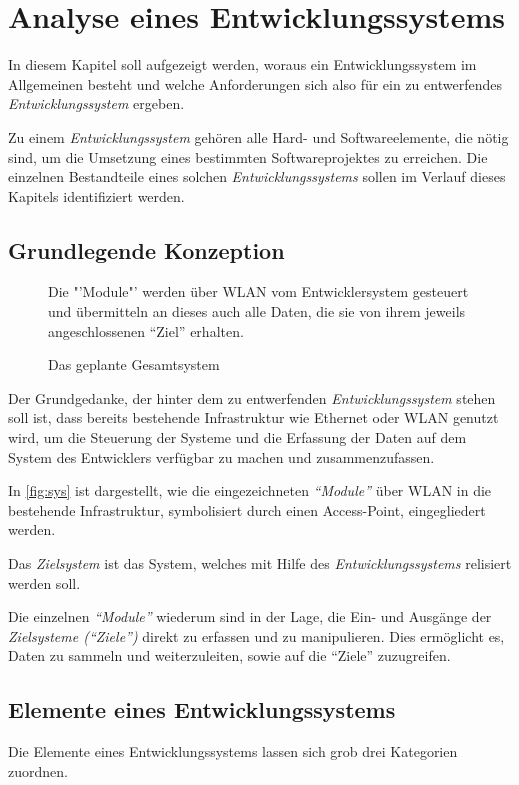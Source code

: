 \chapter{Analyse eines Entwicklungssystems}\label{chap:analyse}
\minitoc
In diesem Kapitel soll aufgezeigt werden, woraus ein Entwicklungssystem
im Allgemeinen besteht und welche Anforderungen sich also für ein zu
entwerfendes \emph{Entwicklungssystem} ergeben.
\begin{definition}[Entwicklungssystem]
Zu einem \emph{Entwicklungssystem} gehören
alle Hard- und Softwareelemente, die nötig sind, um die Umsetzung eines
bestimmten Softwareprojektes zu erreichen. Die einzelnen Bestandteile eines
solchen \emph{Entwicklungssystems} sollen im Verlauf dieses Kapitels
identifiziert werden.
\end{definition}
\section{Grundlegende Konzeption}
\begin{figure}[H]
\centering
\def\svgwidth{\columnwidth}

\caption{Das geplante Gesamtsystem}{Die "'Module"' werden über WLAN
vom Entwicklersystem gesteuert und übermitteln an dieses auch alle
Daten, die sie von ihrem jeweils angeschlossenen "`Ziel"' erhalten.}
\label{fig:sys}
\end{figure}
Der Grundgedanke, der hinter dem zu entwerfenden \emph{Entwicklungssystem}
stehen soll ist, dass bereits bestehende Infrastruktur wie Ethernet oder WLAN
genutzt wird, um die Steuerung der Systeme und die Erfassung der Daten
auf dem System des Entwicklers verfügbar zu machen und zusammenzufassen.

In \autoref{fig:sys} ist dargestellt, wie die eingezeichneten \emph{"`Module"'}
über WLAN in die bestehende Infrastruktur, symbolisiert durch einen
Access-Point, eingegliedert werden.
\begin{definition}[Zielsystem]
Das \emph{Zielsystem} ist das System, welches mit Hilfe des
\emph{Entwicklungssystems} relisiert werden soll.
\end{definition}
Die einzelnen \emph{"`Module"'} wiederum sind in der Lage, die Ein- und Ausgänge
der \emph{Zielsysteme ("`Ziele"')} direkt zu erfassen und zu manipulieren. Dies
ermöglicht es, Daten zu sammeln und weiterzuleiten, sowie auf die "`Ziele"'
zuzugreifen.

\section{Elemente eines Entwicklungssystems}
Die Elemente eines Entwicklungssystems lassen sich grob drei Kategorien
zuordnen. 

